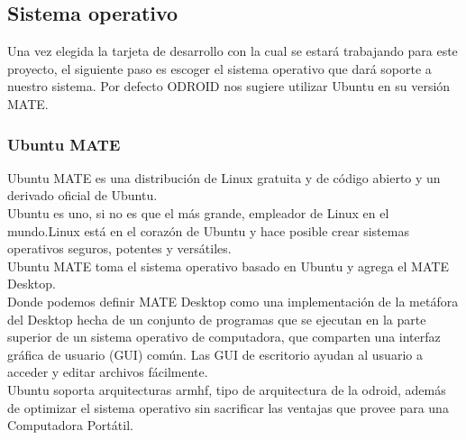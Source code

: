 \subsection{Sistema operativo}
Una vez elegida la tarjeta de desarrollo con la cual se estará trabajando para este
proyecto, el siguiente paso es escoger el sistema operativo que dará soporte a nuestro
sistema. Por defecto ODROID nos sugiere utilizar Ubuntu en su versión MATE.
\subsubsection{Ubuntu MATE}
Ubuntu MATE es una distribución de Linux gratuita y de código abierto y un derivado
oficial de Ubuntu.\\
Ubuntu es uno, si no es que el más grande, empleador de Linux en el mundo.Linux está en el
corazón de Ubuntu y hace posible crear sistemas operativos seguros, potentes y versátiles.\\
Ubuntu MATE toma el sistema operativo basado en Ubuntu y agrega el MATE Desktop.\\
Donde podemos definir MATE Desktop como una implementación de la metáfora del Desktop 
hecha de un conjunto de programas que se ejecutan en la parte superior de un sistema 
operativo de computadora, que comparten una interfaz gráfica de usuario (GUI) común. 
Las GUI de escritorio ayudan al usuario a acceder y editar archivos fácilmente.
~\cite{ubuntu2014}\\
Ubuntu soporta arquitecturas armhf, tipo de arquitectura de la odroid, además de optimizar
el sistema operativo sin sacrificar las ventajas que provee para una Computadora Portátil.
